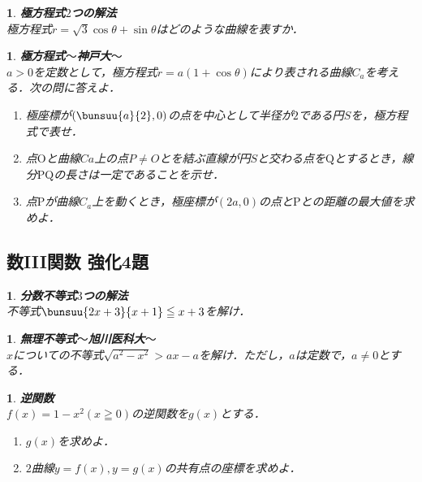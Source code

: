 \documentclass[10pt,
fleqn,
dvipdfmx,
uplatex
]{jsarticle}
\newtheorem{question}[Question]{}
\begin{document}
\begin{question}{\bf\boldmath 極方程式$2$つの解法}\\
極方程式$r=\sqrt 3\cos \theta +\sin \theta$はどのような曲線を表すか．
\end{question}



\begin{question}{\bf\boldmath 極方程式$〜$神戸大$〜$}\\
$a>0$を定数として，極方程式$r=a\left(1+\cos \theta \right)$により表される曲線$C_a$を考える．次の問に答えよ．
\begin{enumerate}
\item 極座標が$\left(\bunsuu{a}{2},0\right)$の点を中心として半径が$2$である円$S$を，極方程式で表せ．
\item 点$\text{O}$と曲線$Ca$上の点$P\neq O$とを結ぶ直線が円$S$と交わる点を$\text{Q}$とするとき，線分$\text{PQ}$の長さは一定であることを示せ．
\item 点$\text{P}$が曲線$C_a$上を動くとき，極座標が$\left(2a,0\right)$の点と$\text{P}$との距離の最大値を求めよ．
\end{enumerate}

\end{question}

\subsection{数III関数 強化4題}



\begin{question}{\bf\boldmath 分数不等式$3$つの解法}\\
不等式$\bunsuu{{2x+3}}{{x+1}}\leqq x+3$を解け．
\end{question}



\begin{question}{\bf\boldmath 無理不等式$〜$旭川医科大$〜$}\\
$x$についての不等式$\sqrt {a^2-x^2}>ax-a$を解け．ただし，$a$は定数で，$a\neq 0$とする．
\end{question}



\begin{question}{\bf\boldmath 逆関数}\\
$f\left(x\right)=1-x^2\left(x\geqq 0\right)$の逆関数を$g\left(x\right)$とする．
\begin{enumerate}
\item $g\left(x\right)$を求めよ．
\item $2$曲線$y=f\left(x\right), y=g\left(x\right)$の共有点の座標を求めよ．
\end{enumerate}

\end{question}
\end{document}
